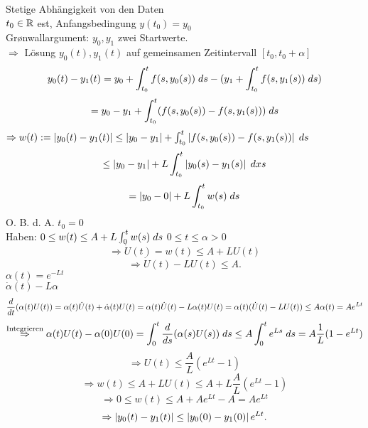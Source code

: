 \documentclass[../ana2.tex]{subfiles}
\begin{document}
Stetige Abhängigkeit von den Daten\\
\( t_0 \in \R \) est, Anfangsbedingung \( y(t_0) = y_0 \)\\
Gr\o{}nwallargument: \( y_0, y_1 \) zwei Startwerte.\\
\( \Rightarrow \) Lösung \( y_0(t), y_1(t) \) auf gemeinsamen Zeitintervall \( [t_0, t_0 + \alpha] \)
\[ y_0(t) - y_1(t) = y_0 + \integralx{ f(s, y_0(s)) }{t_0}{t}{s} - (y_1 + \integralx{f(s, y_1(s))}{t_0}{t}{s}) \]
\[ = y_0 - y_1 + \integralx{ (f(s, y_0(s)) - f(s, y_1(s))) }{t_0}{t}{s} \]
\( \Rightarrow w(t) := \abs{ y_0(t) - y_1(t) } 
\leq \abs{ y_0 - y_1 } 
+ \integralx{ \abs{ f(s, y_0(s)) - f(s, y_1(s)) } }{t_0}{t}{s} \)
\[ \leq \abs{ y_0 - y_1 } + L \integral{ \abs{ y_0(s) - y_1(s) } }{t_0}{t}{s} \]
\[= \abs{y_0 - 0} + L \integralx{w(s)}{t_0}{t}{s} \]
O. B. d. A. \( t_0 = 0 \)\\
Haben: \( 0 \leq w(t) \leq A + L \integralx{w(s)}{0}{t}{s} \)
\(0 \leq t \leq \alpha > 0\)
\[ \Rightarrow \dot{U}(t) = w(t) \leq A + L U(t) \]
\[ \Rightarrow \dot{U}(t) - LU(t) \leq A. \]
\( \alpha(t) = e^{-L t} \)\\
\( \dot{\alpha}(t) -L \alpha \)
\[ \ddx{t}(\alpha(t) U(t)) 
= \alpha(t) \dot{U}(t) + \dot{\alpha}(t) U(t) 
= \alpha(t) \dot{U}(t) - L \alpha(t) U(t)
= \alpha(t) (\dot{U}(t) - LU(t)) 
\leq A \alpha(t) = A e^{Lt} \]
\[ \oversett{Integrieren}{\Rightarrow} \alpha(t) U(t) - \alpha(0) U(0) 
= \integralx{ \ddx{s} (\alpha(s) U(s)) }{0}{t}{s} 
\leq A \integralx{ e^{Ls} }{0}{t}{s} 
= A \frac{1}{L} (1 - e^{Lt}) \]
\[ \Rightarrow U(t) \leq \frac{A}{L}(e^{Lt} - 1) \]
\[ \Rightarrow w(t) \leq A + L U(t) \leq A + L \frac{A}{L} (e^{Lt} - 1) \]
\[ \Rightarrow 0 \leq w(t) \leq A + A e^{Lt} - A = Ae^{Lt} \]
\[ \Rightarrow \abs{ y_0(t) - y_1(t) } \leq \abs{ y_0(0) - y_1(0) }e^{Lt}. \]
\end{document}
